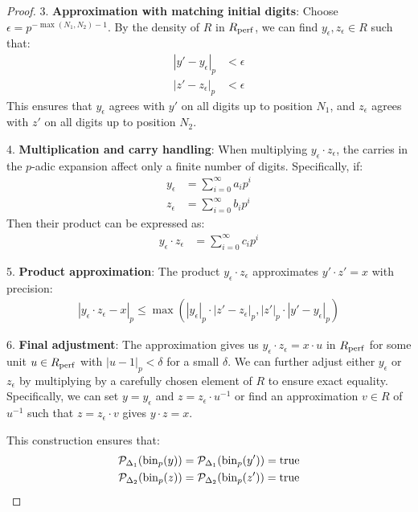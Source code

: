 \begin{proof}
3. \textbf{Approximation with matching initial digits}: Choose $\epsilon = p^{-\max(N_1,N_2)-1}$. By the density of $R$ in $R_{\operatorname{perf}}$, we can find $y_{\epsilon}, z_{\epsilon} \in R$ such that:
   \begin{align*}
   |y' - y_{\epsilon}|_p &< \epsilon \\
   |z' - z_{\epsilon}|_p &< \epsilon
   \end{align*}
   This ensures that $y_{\epsilon}$ agrees with $y'$ on all digits up to position $N_1$, and $z_{\epsilon}$ agrees with $z'$ on all digits up to position $N_2$.

4. \textbf{Multiplication and carry handling}: When multiplying $y_{\epsilon} \cdot z_{\epsilon}$, the carries in the $p$-adic expansion affect only a finite number of digits. Specifically, if:
   \begin{align*}
   y_{\epsilon} &= \sum_{i=0}^{\infty} a_i p^i \\
   z_{\epsilon} &= \sum_{i=0}^{\infty} b_i p^i 
   \end{align*}
   Then their product can be expressed as:
   \begin{align*}
   y_{\epsilon} \cdot z_{\epsilon} &= \sum_{i=0}^{\infty} c_i p^i
   \end{align*}

5. \textbf{Product approximation}: The product $y_{\epsilon} \cdot z_{\epsilon}$ approximates $y' \cdot z' = x$ with precision:
   \begin{align*}
   |y_{\epsilon} \cdot z_{\epsilon} - x|_p \leq \max(|y_{\epsilon}|_p \cdot |z' - z_{\epsilon}|_p, |z'|_p \cdot |y' - y_{\epsilon}|_p)
   \end{align*}

6. \textbf{Final adjustment}: The approximation gives us $y_{\epsilon} \cdot z_{\epsilon} = x \cdot u$ in $R_{\operatorname{perf}}$ for some unit $u \in R_{\operatorname{perf}}$ with $|u-1|_p < \delta$ for a small $\delta$. We can further adjust either $y_{\epsilon}$ or $z_{\epsilon}$ by multiplying by a carefully chosen element of $R$ to ensure exact equality. Specifically, we can set $y = y_{\epsilon}$ and $z = z_{\epsilon} \cdot u^{-1}$ or find an approximation $v \in R$ of $u^{-1}$ such that $z = z_{\epsilon} \cdot v$ gives $y \cdot z = x$.

This construction ensures that:
\begin{align*}
\mathcal{P}_{\Delta_1}(\operatorname{bin}_p(y)) &= \mathcal{P}_{\Delta_1}(\operatorname{bin}_p(y')) = \text{true} \\
\mathcal{P}_{\Delta_2}(\operatorname{bin}_p(z)) &= \mathcal{P}_{\Delta_2}(\operatorname{bin}_p(z')) = \text{true}
\end{align*}


\end{proof}
